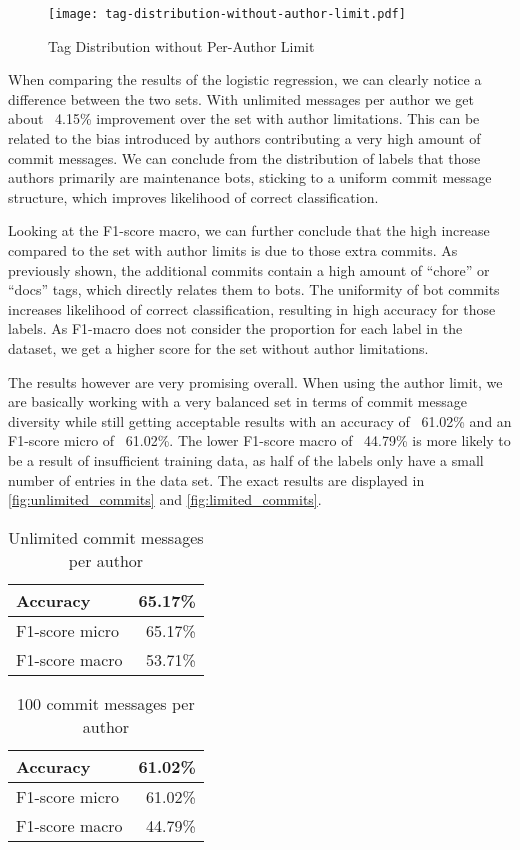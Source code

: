 \begin{figure}[H]
  \centering
  \texttt{[image: tag-distribution-without-author-limit.pdf]}
  \caption{Tag Distribution without Per-Author Limit}
  \label{fig:tag_dist_without_limit}
\end{figure}

When comparing the results of the logistic regression, we can clearly notice a difference between the two sets.
With unlimited messages per author we get about ~4.15\% improvement over the set with author limitations. This
can be related to the bias introduced by authors contributing a very high amount of commit messages. We can
conclude from the distribution of labels that those authors primarily are maintenance bots, sticking to a
uniform commit message structure, which improves likelihood of correct classification.

Looking at the F1-score macro, we can further conclude that the high increase compared to the set with author
limits is due to those extra commits. As previously shown, the additional commits contain a high amount of
“chore” or “docs” tags, which directly relates them to bots. The uniformity of bot commits increases likelihood
of correct classification, resulting in high accuracy for those labels. As F1-macro does not consider the
proportion for each label in the dataset, we get a higher score for the set without author limitations.

The results however are very promising overall. When using the author limit, we are basically working with a
very balanced set in terms of commit message diversity while still getting acceptable results with an accuracy
of ~61.02\% and an F1-score micro of ~61.02\%. The lower F1-score macro of ~44.79\% is more likely to be a
result of insufficient training data, as half of the labels only have a small number of entries in the data set.
The exact results are displayed in \autoref{fig:unlimited_commits} and \autoref{fig:limited_commits}.

\begin{table}[H]
  \def\arraystretch{1.15}%
  \centering
  \begin{tabular}{|l|r|}
    \hline
    Accuracy       & 65.17\% \\
    \hline
    F1-score micro & 65.17\% \\
    \hline
    F1-score macro & 53.71\% \\
    \hline
  \end{tabular}
  \caption{Unlimited commit messages per author}
  \label{fig:unlimited_commits}
\end{table}

\begin{table}[H]
  \def\arraystretch{1.15}%
  \centering
  \begin{tabular}{|l|r|}
    \hline
    Accuracy       & 61.02\% \\
    \hline
    F1-score micro & 61.02\% \\
    \hline
    F1-score macro & 44.79\% \\
    \hline
  \end{tabular}
  \caption{100 commit messages per author}
  \label{fig:limited_commits}
\end{table}

